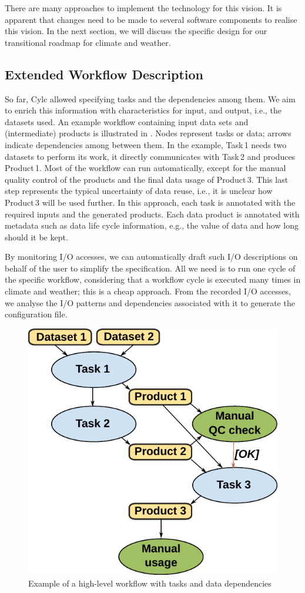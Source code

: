 \documentclass[a4paper]{article}
\begin{document}
There are many approaches to implement the technology for this vision. It is apparent that changes need to be made to several software components to realise this vision.
In the next section, we will discuss the specific design for our transitional roadmap for climate and weather.


\subsection{Extended Workflow Description}

So far, Cylc allowed specifying tasks and the dependencies among them.
We aim to enrich this information with characteristics for input, and output, i.e., the datasets used.
An example workflow containing input data sets and (intermediate) products is illustrated in .
Nodes represent tasks or data; arrows indicate dependencies among between them.
In the example, Task\,1 needs two datasets to perform its work, it directly communicates with Task\,2 and produces Product\,1.
Most of the workflow can run automatically, except for the manual quality control of the products and the final data usage of Product\,3.
This last step represents the typical uncertainty of data reuse, i.e., it is unclear how Product\,3 will be used further.
In this approach, each task is annotated with the required inputs and the generated products.
Each data product is annotated with metadata such as data life cycle information, e.g., the value of data and how long should it be kept.


By monitoring I/O accesses, we can automatically draft such I/O descriptions on behalf of the user to simplify the specification.
All we need is to run one cycle of the specific workflow, considering that a workflow cycle is executed many times in climate and weather; this is a cheap approach.
From the recorded I/O accesses, we analyse the I/O patterns and dependencies associated with it to generate the configuration file.

\begin{figure}[H]
  \centering
  \includegraphics[width=0.4\columnwidth]{workflow}
  \caption{Example of a high-level workflow with tasks and data dependencies}
  \label{fig:workflow}
\end{figure}
\end{document}
